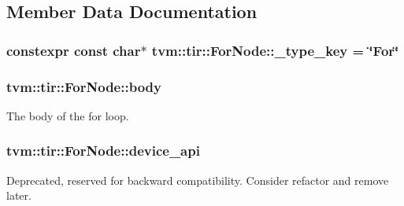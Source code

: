 \subsection{Member Data Documentation}
\subsubsection[{\texorpdfstring{\+\_\+type\+\_\+key}{_type_key}}]{\setlength{\rightskip}{0pt plus 5cm}constexpr const char$\ast$ tvm\+::tir\+::\+For\+Node\+::\+\_\+type\+\_\+key = \char`\"{}For\char`\"{}\hspace{0.3cm}{\ttfamily [static]}}\hypertarget{classtvm_1_1tir_1_1ForNode_a760906dd7bcaf7328aa284499471447d}{}\label{classtvm_1_1tir_1_1ForNode_a760906dd7bcaf7328aa284499471447d}
\subsubsection[{\texorpdfstring{body}{body}}]{ tvm\+::tir\+::\+For\+Node\+::body}\hypertarget{classtvm_1_1tir_1_1ForNode_ac92e3680d0609f7789b08cc235095de5}{}\label{classtvm_1_1tir_1_1ForNode_ac92e3680d0609f7789b08cc235095de5}


The body of the for loop. 

\subsubsection[{\texorpdfstring{device\+\_\+api}{device_api}}]{ tvm\+::tir\+::\+For\+Node\+::device\+\_\+api}\hypertarget{classtvm_1_1tir_1_1ForNode_a54688f6170879ac18d23a36beea47b6e}{}\label{classtvm_1_1tir_1_1ForNode_a54688f6170879ac18d23a36beea47b6e}


Deprecated, reserved for backward compatibility. Consider refactor and remove later. 

